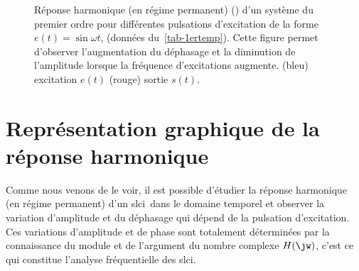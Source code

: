 \begin{figure}[!h]
\begin{center}
\caption{Réponse harmonique (en régime permanent) () d'un système du premier ordre
pour différentes pulsations d'excitation de la forme $e(t)=\sin{\omega t}$, (données du~\cref{tab-1ertemp}).
Cette figure permet d'observer l'augmentation du déphasage et la diminution 
de l'amplitude lorsque la fréquence d'excitations augmente. 
(bleu) excitation $e(t)$ (rouge) sortie $s(t)$.\label{fig-repham}}
\end{center}
\end{figure}







\newpage
\section{Représentation graphique de la réponse harmonique}


Comme nous venons de le voir, il est possible d'étudier
la réponse harmonique (en régime permanent) d'un \gls{slci}~dans le domaine 
temporel et observer la variation d'amplitude et du 
déphasage qui dépend de la pulsation d'excitation. Ces variations 
d'amplitude et de phase sont totalement déterminées par la 
connaissance du module et de l'argument du nombre complexe $H(\jw)$, c'est ce qui constitue 
l'analyse fréquentielle des \gls{slci}.

